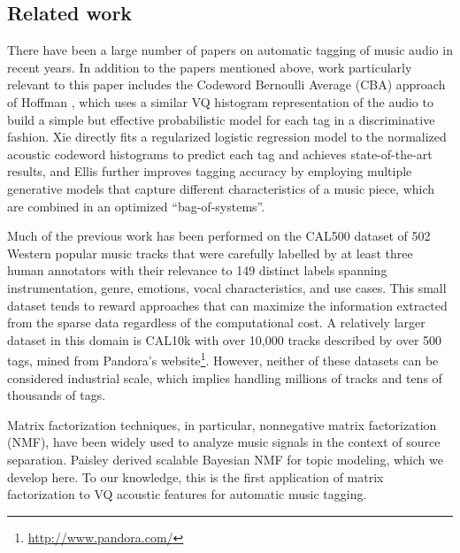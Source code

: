 \subsection{Related work}

There have been a large number of papers on automatic tagging of music audio in recent years.  
In addition to the papers mentioned above, work particularly relevant to this paper includes the Codeword Bernoulli Average (CBA) approach of Hoffman \etal \cite{hoffman2009easy}, which uses a similar VQ histogram representation of the audio to build a simple but effective probabilistic model for each tag in a discriminative fashion.  Xie \etal\cite{xie2011music} directly fits a regularized logistic regression model to the normalized acoustic codeword histograms to predict each tag and achieves state-of-the-art results, and Ellis \etal\cite{ellis2013bag} further improves tagging accuracy by employing multiple generative models that capture different characteristics of a music piece, which are combined in an optimized ``bag-of-systems''. 

Much of the previous work has been performed on the CAL500 dataset \cite{Turnbull_SemanticAudio} of 502 Western popular music tracks that were carefully labelled by at least three human annotators with their relevance to 149 distinct labels spanning instrumentation, genre, emotions, vocal characteristics, and use cases. This small dataset tends to reward approaches that can maximize the information extracted from the sparse data regardless of the computational cost. A relatively larger dataset in this domain is CAL10k\cite{tingle2010exploring} with over 10,000 tracks described by over 500 tags, mined from Pandora's website\footnote{\url{http://www.pandora.com/}}. However, neither of these datasets can be considered industrial scale, which implies handling millions of tracks and tens of thousands of tags.

Matrix factorization techniques, in particular, nonnegative matrix factorization (NMF), have been widely used to analyze music signals \cite{hoffman2010bayesian, liang2013beta} in the context of source separation. Paisley \etal \cite{paisley2015handbook} derived scalable Bayesian NMF for topic modeling, which we develop here. To our knowledge, this is the first application of matrix factorization to VQ acoustic features for automatic music tagging.



